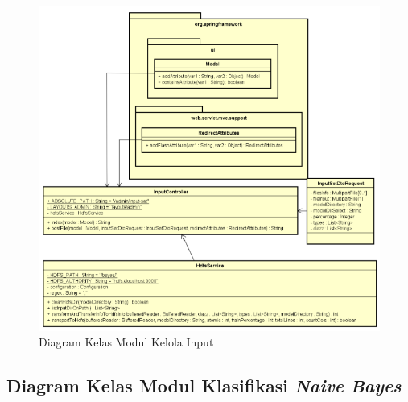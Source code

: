 \begin{figure}[H]
	\centering
	\includegraphics[scale=0.85]{ClassDiagramLengkap/CD_Input}
	\caption[Diagram Kelas Modul Kelola Input]{Diagram Kelas Modul Kelola Input}
	\label{fig:Diagram Kelas Modul Kelola Input}
\end{figure}

\subsection{Diagram Kelas Modul Klasifikasi \textit{Naive Bayes}}

